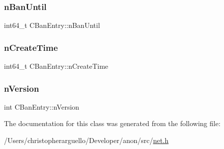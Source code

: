 \subsubsection{\texorpdfstring{n\+Ban\+Until}{nBanUntil}}
{\footnotesize\ttfamily int64\+\_\+t C\+Ban\+Entry\+::n\+Ban\+Until}

\mbox{\label{class_c_ban_entry_a646408bd4046c05a14fb4aa8fbc1541a}} 
\subsubsection{\texorpdfstring{n\+Create\+Time}{nCreateTime}}
{\footnotesize\ttfamily int64\+\_\+t C\+Ban\+Entry\+::n\+Create\+Time}

\mbox{\label{class_c_ban_entry_acfe8c22d99805d72b0144cbb525a58f1}} 
\subsubsection{\texorpdfstring{n\+Version}{nVersion}}
{\footnotesize\ttfamily int C\+Ban\+Entry\+::n\+Version}



The documentation for this class was generated from the following file\+:\begin{DoxyCompactItemize}
\item 
/\+Users/christopherarguello/\+Developer/anon/src/\mbox{\hyperlink{net_8h}{net.\+h}}\end{DoxyCompactItemize}
